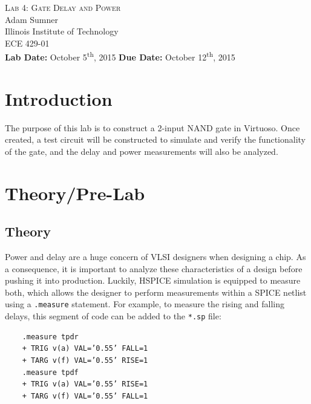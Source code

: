 \documentclass[12pt]{article}
\begin{document}
\begin{titlepage}
	\begin{center}
		
		
		\vfill
		
		\textsc{\LARGE Lab 4: Gate Delay and Power}\\[1.5cm]
		
		\Large Adam Sumner\\[0.5cm]
		
		\Large Illinois Institute of Technology\\[0.5cm]
		
		\Large ECE 429-01\\[0.5cm]	
		
		\noindent
		\vfill
		\large \textbf{Lab Date:} October 5\textsuperscript{th}, 2015\hfill
		\large \textbf{Due Date:} October 12\textsuperscript{th}, 2015
	
		
	\end{center}
\end{titlepage}

\section{Introduction}
The purpose of this lab is to construct a 2-input NAND gate in Virtuoso. Once created, a test circuit will be constructed to simulate and verify the functionality of the gate, and the delay and power measurements will also be analyzed. 
\section{Theory/Pre-Lab}
\subsection{Theory}
Power and delay are a huge concern of VLSI designers when designing a chip. As a consequence, it is important to analyze these characteristics of a design before pushing it into production. Luckily, HSPICE simulation is equipped to measure both, which allows the designer to perform measurements within a SPICE netlist using a \texttt{.measure} statement. For example, to measure the rising and falling delays, this segment of code can be added to the \texttt{*.sp} file: 
\begin{lstlisting}
	.measure tpdr
	+ TRIG v(a) VAL=’0.55’ FALL=1
	+ TARG v(f) VAL=’0.55’ RISE=1
	.measure tpdf
	+ TRIG v(a) VAL=’0.55’ RISE=1
	+ TARG v(f) VAL=’0.55’ FALL=1
\end{lstlisting}
\end{document}
